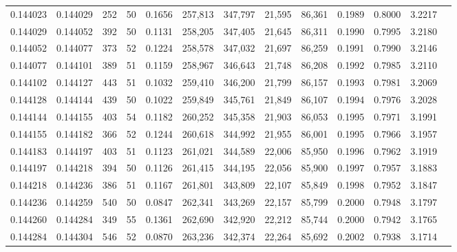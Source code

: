 \begin{tabular}{rrrrrrrrrrrrr}
0.144023 & 0.144029 &   252 &  50 &                                     0.1656 & 257,813 & 347,797 &  21,595 &  86,361 & 0.1989 & 0.8000 & 3.2217 \\
0.144029 & 0.144052 &   392 &  50 &                                     0.1131 & 258,205 & 347,405 &  21,645 &  86,311 & 0.1990 & 0.7995 & 3.2180 \\
0.144052 & 0.144077 &   373 &  52 &                                     0.1224 & 258,578 & 347,032 &  21,697 &  86,259 & 0.1991 & 0.7990 & 3.2146 \\
0.144077 & 0.144101 &   389 &  51 &                                     0.1159 & 258,967 & 346,643 &  21,748 &  86,208 & 0.1992 & 0.7985 & 3.2110 \\
0.144102 & 0.144127 &   443 &  51 &                                     0.1032 & 259,410 & 346,200 &  21,799 &  86,157 & 0.1993 & 0.7981 & 3.2069 \\
0.144128 & 0.144144 &   439 &  50 &                                     0.1022 & 259,849 & 345,761 &  21,849 &  86,107 & 0.1994 & 0.7976 & 3.2028 \\
0.144144 & 0.144155 &   403 &  54 &                                     0.1182 & 260,252 & 345,358 &  21,903 &  86,053 & 0.1995 & 0.7971 & 3.1991 \\
0.144155 & 0.144182 &   366 &  52 &                                     0.1244 & 260,618 & 344,992 &  21,955 &  86,001 & 0.1995 & 0.7966 & 3.1957 \\
0.144183 & 0.144197 &   403 &  51 &                                     0.1123 & 261,021 & 344,589 &  22,006 &  85,950 & 0.1996 & 0.7962 & 3.1919 \\
0.144197 & 0.144218 &   394 &  50 &                                     0.1126 & 261,415 & 344,195 &  22,056 &  85,900 & 0.1997 & 0.7957 & 3.1883 \\
0.144218 & 0.144236 &   386 &  51 &                                     0.1167 & 261,801 & 343,809 &  22,107 &  85,849 & 0.1998 & 0.7952 & 3.1847 \\
0.144236 & 0.144259 &   540 &  50 &                                     0.0847 & 262,341 & 343,269 &  22,157 &  85,799 & 0.2000 & 0.7948 & 3.1797 \\
0.144260 & 0.144284 &   349 &  55 &                                     0.1361 & 262,690 & 342,920 &  22,212 &  85,744 & 0.2000 & 0.7942 & 3.1765 \\
0.144284 & 0.144304 &   546 &  52 &                                     0.0870 & 263,236 & 342,374 &  22,264 &  85,692 & 0.2002 & 0.7938 & 3.1714 \\

\end{tabular}
